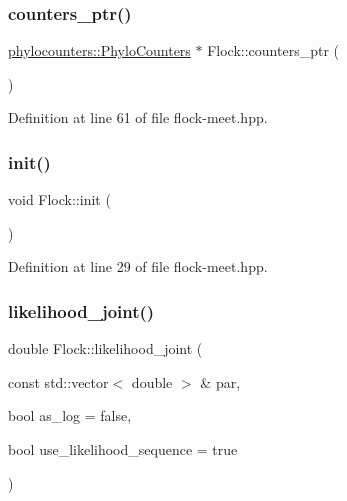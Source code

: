 \subsubsection{\texorpdfstring{counters\+\_\+ptr()}{counters\_ptr()}}
{\footnotesize\ttfamily \hyperlink{namespacebarry_1_1counters_1_1phylo_a4e401ffe66d04091343dcffaf915f8c3}{phylocounters\+::\+Phylo\+Counters} $\ast$ Flock\+::counters\+\_\+ptr (\begin{DoxyParamCaption}{ }\end{DoxyParamCaption})\hspace{0.3cm}{\ttfamily [inline]}}



Definition at line 61 of file flock-\/meet.\+hpp.

\mbox{\label{class_flock_a99f3c0a3aacc8af28c13207dd81d7164}} 
\subsubsection{\texorpdfstring{init()}{init()}}
{\footnotesize\ttfamily void Flock\+::init (\begin{DoxyParamCaption}{ }\end{DoxyParamCaption})\hspace{0.3cm}{\ttfamily [inline]}}



Definition at line 29 of file flock-\/meet.\+hpp.

\mbox{\label{class_flock_a701dce27fdc0a20e63caec1e1fd3def7}} 
\subsubsection{\texorpdfstring{likelihood\+\_\+joint()}{likelihood\_joint()}}
{\footnotesize\ttfamily double Flock\+::likelihood\+\_\+joint (\begin{DoxyParamCaption}\item[{const std\+::vector$<$ double $>$ \&}]{par,  }\item[{bool}]{as\+\_\+log = {\ttfamily false},  }\item[{bool}]{use\+\_\+likelihood\+\_\+sequence = {\ttfamily true} }\end{DoxyParamCaption})\hspace{0.3cm}{\ttfamily [inline]}}



